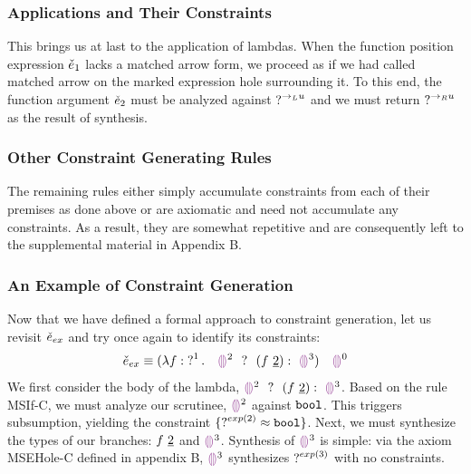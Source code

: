\subsubsection{Applications and Their Constraints}
This brings us at last to the application of lambdas. When the function position expression $\ECMV_1$ lacks a matched arrow form, we proceed as if we had called matched arrow on the marked expression hole surrounding it. To this end, the function argument $\ECMV_2$ must be analyzed against $\TUnknown^{\rightarrow_L{u}}$ and we must return $\TUnknown^{\rightarrow_R{u}}$ as the result of synthesis. 
\begin{mathpar}
\end{mathpar}

\subsubsection{Other Constraint Generating Rules}
The remaining rules either simply accumulate constraints from each of their premises as done above or are axiomatic and need not accumulate any constraints. As a result, they are somewhat repetitive and are consequently left to the supplemental material in Appendix B. 

\subsubsection{An Example of Constraint Generation}
Now that we have defined a formal approach to constraint generation, let us revisit $\ECMV_{ex}$ and try once again to identify its constraints:
$$\ECMV_{ex} \equiv \ECAp{(\ECLam{f}{\TUnknown^1}{~~\ECIf{\EEHole^2~}{~(\ECAp{f}{\underline{2}})}{~\EEHole^3}})}{~~\EEHole^0}$$
We first consider the body of the lambda, $\ECIf{\EEHole^2~}{~(\ECAp{f}{\underline{2}})}{~\EEHole^3}$. Based on the rule MSIf-C, we must analyze our scrutinee, $\EEHole^2$ against $\tbool$. This triggers subsumption, yielding the constraint $\{ \TUnknown^{exp(2)} \approx \tbool \}$. Next, we must synthesize the types of our branches: $\ECAp{f}{\underline{2}}$ and $\EEHole^3$. Synthesis of $\EEHole^3$ is simple: via the axiom MSEHole-C defined in appendix B, $\EEHole^3$ synthesizes $\TUnknown^{exp(3)}$ with no constraints.

